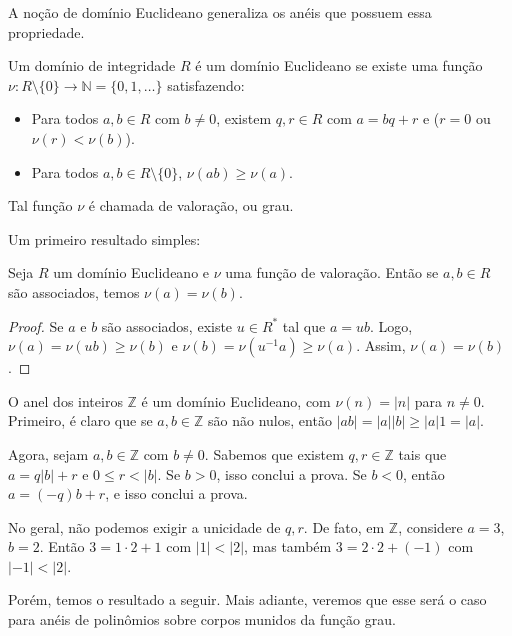 A noção de domínio Euclideano generaliza os anéis que possuem essa propriedade.

\begin{definition}
    Um domínio de integridade $R$ é um domínio Euclideano
    se existe uma função $\nu:R\setminus \{0\} \to \mathbb N=\{0, 1, \dots\}$ satisfazendo:
    \begin{itemize}
        \item Para todos $a, b \in R$ com $b\neq 0$, existem $q, r \in R$ com $a=bq+r$ e ($r=0$ ou $\nu(r)<\nu(b)$).
        \item Para todos $a, b \in R\setminus \{0\}$, $\nu(ab)\geq \nu(a)$.
    \end{itemize}

    Tal função $\nu$ é chamada de valoração, ou grau.
\end{definition}
Um primeiro resultado simples:
\begin{definition}
    Seja $R$ um domínio Euclideano e $\nu$ uma função de valoração.
    Então se $a, b \in R$ são associados, temos $\nu(a)=\nu(b)$.
\end{definition}
\begin{proof}
    Se $a$ e $b$ são associados, existe $u \in R^*$ tal que $a=ub$.
    Logo, $\nu(a)=\nu(ub)\geq \nu(b)$ e $\nu(b)=\nu(u^{-1}a)\geq \nu(a)$.
    Assim, $\nu(a)=\nu(b)$.
\end{proof}

\begin{exemplo}
    O anel dos inteiros $\mathbb Z$ é um domínio Euclideano, com $\nu(n)=|n|$ para $n\neq 0$.
    Primeiro, é claro que se $a, b\in \mathbb Z$ são não nulos, então $|ab|=|a||b|\geq |a|1=|a|$.

    Agora, sejam $a, b\in \mathbb Z$ com $b\neq 0$.
    Sabemos que existem $q, r \in \mathbb Z$ tais que $a=q|b|+r$ e $0\leq r < |b|$.
    Se $b>0$, isso conclui a prova.
    Se $b<0$, então $a=(-q)b+r$, e isso conclui a prova.
\end{exemplo}

\begin{exemplo}
    No geral, não podemos exigir a unicidade de $q, r$.
    De fato, em $\mathbb Z$, considere $a=3$, $b=2$.
    Então $3=1\cdot 2+1$ com $|1|<|2|$, mas também $3=2\cdot 2+(-1)$ com $|-1|<|2|$.
\end{exemplo}

Porém, temos o resultado a seguir.
Mais adiante, veremos que esse será o caso para anéis de polinômios sobre corpos munidos da função grau.


